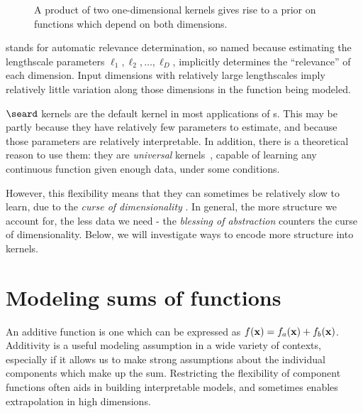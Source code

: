 \begin{figure}[ht!]
\begin{tabular}{ccccccc}
\end{tabular}
\caption[A product of squared-exponential kernels across different dimensions]{
A product of two one-dimensional kernels gives rise to a prior on functions which depend on both dimensions.
}
\label{fig:product-of-se-kernels}
\end{figure}

\ARD{} stands for automatic relevance determination, so named because estimating the lengthscale parameters $\ell_1, \ell_2, \dots, \ell_D$, implicitly determines the ``relevance'' of each dimension.
Input dimensions with relatively large lengthscales imply relatively little variation along those dimensions in the function being modeled.

$\seard$ kernels are the default kernel in most applications of \gp{}s.
This may be partly because they have relatively few parameters to estimate, and because those parameters are relatively interpretable.
In addition, there is a theoretical reason to use them: they are \emph{universal} kernels~\citep{micchelli2006universal}, capable of learning any continuous function given enough data, under some conditions.

However, this flexibility means that they can sometimes be relatively slow to learn, due to the \emph{curse of dimensionality} \citep{bellman1956dynamic}.
In general, the more structure we account for, the less data we need - the \emph{blessing of abstraction} \citep{goodman2011learning} counters the curse of dimensionality.
Below, we will investigate ways to encode more structure into kernels.



\section{Modeling sums of functions}
\label{sec:modeling-sums-of-functions}
An additive function is one which can be expressed as $f({\bf{x}}) = f_a({\bf{x}}) + f_b({\bf{x}})$.
Additivity is a useful modeling assumption in a wide variety of contexts, especially if it allows us to make strong assumptions about the individual components which make up the sum.
Restricting the flexibility of component functions often aids in building interpretable models, and sometimes enables extrapolation in high dimensions.


